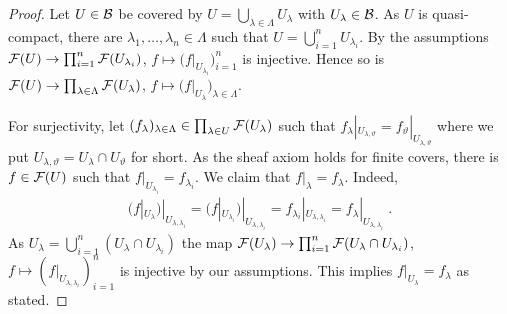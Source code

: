 \documentclass[a4paper,parskip=half,numbers=enddot, DIV=12]{scrreprt}
\begin{document}
\begin{proof}
    Let $U\in \mathcal{B}$ be covered by $U = \bigcup_{\lambda\in \Lambda} U_\lambda$ with $U_\lambda \in \mathcal{B}$. As $U$ is quasi-compact, there are $\lambda_1,\ldots,\lambda_n\in \Lambda$ such that $U= \bigcup_{i=1}^n U_{\lambda_i}$. By the assumptions $\Ff(U)\morphism \prod_{i=1}^n \Ff(U_{\lambda_i})$, $f\mapsto \big(f|_{U_{\lambda_i}}\big)_{i=1}^n$ is injective. Hence so is $\Ff(U)\morphism \prod_{\lambda\in \Lambda} \Ff(U_\lambda)$, $f\mapsto\big(f|_{U_\lambda}\big)_{\lambda\in\Lambda}$. 
    
    For surjectivity, let $(f_\lambda)_{\lambda\in \Lambda}\in \prod_{\lambda\in U}\mathcal{F}(U_\lambda)$ such that $f_\lambda|_{U_{\lambda,\vartheta}} = f_\vartheta|_{U_{\lambda,\vartheta}}$ where we put $U_{\lambda,\vartheta}=U_\lambda\cap U_\vartheta$ for short. As the sheaf axiom holds for finite covers, there is $f\in \mathcal{F}(U)$ such that $f|_{U_{\lambda_i}} = f_{\lambda_i}$. We claim that $f|_\lambda = f_\lambda$. Indeed,
    \begin{align*}
        (f|_{U_\lambda})|_{U_{\lambda,\lambda_i}} = (f|_{U_{\lambda_i}})|_{U_{\lambda,\lambda_i}} = f_{\lambda_i}|_{U_{\lambda,\lambda_i}} = f_\lambda|_{U_{\lambda,\lambda_i}}\;.
    \end{align*}
    As $U_\lambda = \bigcup_{i=1}^n(U_\lambda\cap U_{\lambda_i})$ the map $\Ff(U_\lambda) \morphism \prod_{i=1}^n \Ff(U_\lambda\cap U_{\lambda_i})$, $f\mapsto (f|_{U_{\lambda,\lambda_i}})_{i=1}^n$ is injective by our assumptions. This implies $f|_{U_\lambda}=f_\lambda$ as stated.
\end{proof}
\end{document}
